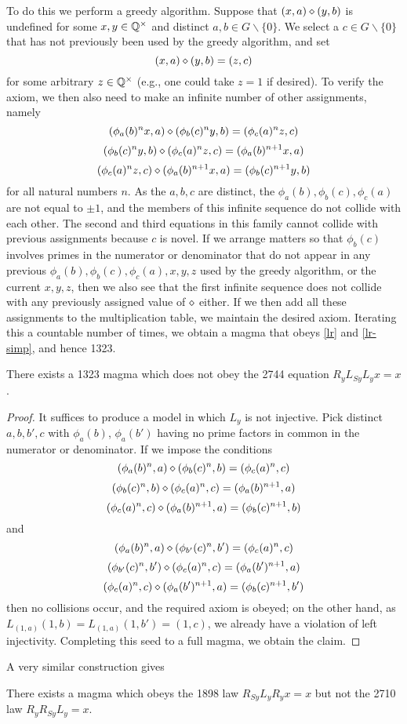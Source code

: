 To do this we perform a greedy algorithm.  Suppose that $(x,a) \diamond (y,b)$ is undefined for some $x,y \in \mathbb{Q}^\times$ and distinct $a,b \in G \backslash \{0\}$.  We select a $c \in G \backslash \{0\}$ that has not previously been used by the greedy algorithm, and set
$$ (x,a) \diamond (y,b) = (z,c)$$
for some arbitrary $z \in \mathbb{Q}^\times$ (e.g., one could take $z=1$ if desired).  To verify the axiom, we then also need to make an infinite number of other assignments, namely
$$ (\phi_a(b)^n x,a) \diamond (\phi_b(c)^n y,b) = (\phi_c(a)^n z,c)$$
$$ (\phi_b(c)^n y,b) \diamond (\phi_c(a)^n z,c) = (\phi_a(b)^{n+1} x, a)$$
$$ (\phi_c(a)^n z,c) \diamond (\phi_a(b)^{n+1} x, a) = (\phi_b(c)^{n+1} y,b)$$
for all natural numbers $n$.  As the $a,b,c$ are distinct, the $\phi_a(b), \phi_b(c), \phi_c(a)$ are not equal to $\pm 1$, and the members of this infinite sequence do not collide with each other.  The second and third equations in this family cannot collide with previous assignments because $c$ is novel.  If we arrange matters so that $\phi_b(c)$ involves primes in the numerator or denominator that do not appear in any previous $\phi_a(b), \phi_b(c), \phi_c(a), x, y, z$ used by the greedy algorithm, or the current $x,y,z$, then we also see that the first infinite sequence does not collide with any previously assigned value of $\diamond$ either.  If we then add all these assignments to the multiplication table, we maintain the desired axiom.  Iterating this a countable number of times, we obtain a magma that obeys \eqref{lr} and \eqref{lr-simp}, and hence 1323.

\begin{corollary}\label{1323-refute-2744}  There exists a 1323 magma which does not obey the 2744 equation $R_y L_{Sy} L_y x = x$.
\end{corollary}

\begin{proof} It suffices to produce a model in which $L_y$ is not injective. Pick distinct $a, b, b', c$ with $\phi_a(b)$, $\phi_a(b')$ having no prime factors in common in the numerator or denominator.  If we impose the conditions
$$ (\phi_a(b)^n,a) \diamond (\phi_b(c)^n,b) = (\phi_c(a)^n,c)$$
$$ (\phi_b(c)^n,b) \diamond (\phi_c(a)^n,c) = (\phi_a(b)^{n+1}, a)$$
$$ (\phi_c(a)^n,c) \diamond (\phi_a(b)^{n+1}, a) = (\phi_b(c)^{n+1},b)$$
and
$$ (\phi_a(b)^n,a) \diamond (\phi_{b'}(c)^n,b') = (\phi_c(a)^n,c)$$
$$ (\phi_{b'}(c)^n,b') \diamond (\phi_c(a)^n,c) = (\phi_a(b')^{n+1}, a)$$
$$ (\phi_c(a)^n,c) \diamond (\phi_{a}(b')^{n+1}, a) = (\phi_b(c)^{n+1},b')$$
then no collisions occur, and the required axiom is obeyed; on the other hand, as $L_{(1,a)} (1,b) = L_{(1,a)} (1,b') = (1,c)$, we already have a violation of left injectivity.  Completing this seed to a full magma, we obtain the claim.
\end{proof}

A very similar construction gives

\begin{corollary}\label{1898-refute-1729}  There exists a magma which obeys the 1898 law $R_{Sy} L_y R_y x = x$ but not the 2710 law $R_y R_{Sy} L_y = x$.
\end{corollary}

